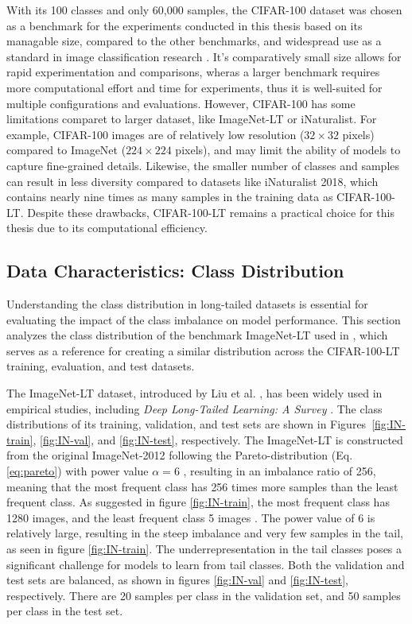 With its 100 classes and only 60,000 samples, the CIFAR-100 dataset was chosen as a benchmark for the experiments conducted in this thesis based on its managable size, compared to the other benchmarks, and widespread use as a standard in image classification research . It's comparatively small size allows for rapid experimentation and comparisons, wheras a larger benchmark requires more computational effort and time for experiments, thus it is well-suited for multiple configurations and evaluations. However, CIFAR-100 has some limitations comparet to larger dataset, like ImageNet-LT or iNaturalist. For example, CIFAR-100 images are of relatively low resolution ($32 \times 32$ pixels) compared to ImageNet ($224 \times 224$ pixels), and may limit the ability of models to capture fine-grained details. Likewise, the smaller number of classes and samples can result in less diversity compared to datasets like iNaturalist 2018, which contains nearly nine times as many samples in the training data as CIFAR-100-LT. Despite these drawbacks, CIFAR-100-LT remains a practical choice for this thesis due to its computational efficiency. 


\subsection{Data Characteristics: Class Distribution}
Understanding the class distribution in long-tailed datasets is essential for evaluating the impact of the class imbalance on model performance. This section analyzes the class distribution of the benchmark ImageNet-LT used in \cite{zhang2023deep}, which serves as a reference for creating a similar distribution across the CIFAR-100-LT training, evaluation, and test datasets.  

The ImageNet-LT dataset, introduced by Liu et al. \cite{liu2019largescalelongtailedrecognitionopen}, has been widely used in empirical studies, including \textit{Deep Long-Tailed Learning: A Survey} \cite{zhang2023deep}. The class distributions of its training, validation, and test sets are shown in Figures~\ref{fig:IN-train}, \ref{fig:IN-val}, and \ref{fig:IN-test}, respectively. The ImageNet-LT is constructed from the original ImageNet-2012 following the Pareto-distribution (Eq. \eqref{eq:pareto}) with power value $\alpha=6$ \cite{liu2019largescalelongtailedrecognitionopen}, resulting in an imbalance ratio of 256, meaning that the most frequent class has 256 times more samples than the least frequent class. As suggested in figure \ref{fig:IN-train}, the most frequent class has 1280 images, and the least frequent class 5 images \cite{liu2019largescalelongtailedrecognitionopen}. The power value of 6 is relatively large, resulting in the steep imbalance and very few samples in the tail, as seen in figure \ref{fig:IN-train}. The underrepresentation in the tail classes poses a significant challenge for models to learn from tail classes. Both the validation and test sets are balanced, as shown in figures \ref{fig:IN-val} and \ref{fig:IN-test}, respectively. There are 20 samples per class in the validation set, and 50 samples per class in the test set.


